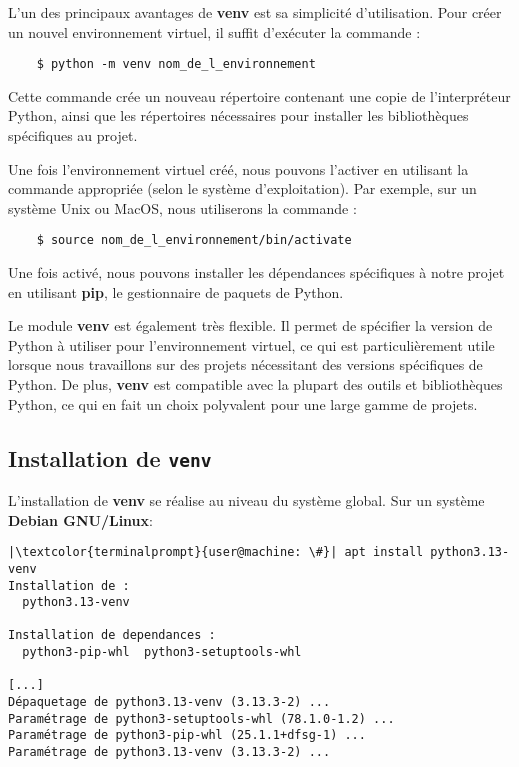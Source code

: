 L'un des principaux avantages de \textbf{venv} est sa simplicité d'utilisation. Pour créer un nouvel environnement virtuel, il suffit d'exécuter la commande :
\begin{verbatim}
    $ python -m venv nom_de_l_environnement
\end{verbatim}

Cette commande crée un nouveau répertoire contenant une copie de l'interpréteur Python, ainsi que les répertoires nécessaires pour installer les bibliothèques spécifiques au projet.

Une fois l'environnement virtuel créé, nous pouvons l'activer en utilisant la commande appropriée (selon le système d'exploitation). Par exemple, sur un système Unix ou MacOS, nous utiliserons la commande :
\begin{verbatim}
    $ source nom_de_l_environnement/bin/activate
\end{verbatim}

Une fois activé, nous pouvons installer les dépendances spécifiques à notre projet en utilisant \textbf{pip}, le gestionnaire de paquets de Python.

Le module \textbf{venv} est également très flexible. Il permet de spécifier la version de Python à utiliser pour l'environnement virtuel, ce qui est particulièrement utile lorsque nous travaillons sur des projets nécessitant des versions spécifiques de Python. De plus, \textbf{venv} est compatible avec la plupart des outils et bibliothèques Python, ce qui en fait un choix polyvalent pour une large gamme de projets.

\subsection*{Installation de \texttt{venv}}
L'installation de \textbf{venv} se réalise au niveau du système global. Sur un système \textbf{Debian GNU/Linux}:

\begin{lstlisting}[style=terminal]
|\textcolor{terminalprompt}{user@machine: \#}| apt install python3.13-venv
Installation de :
  python3.13-venv

Installation de dependances :
  python3-pip-whl  python3-setuptools-whl

[...]
Dépaquetage de python3.13-venv (3.13.3-2) ...
Paramétrage de python3-setuptools-whl (78.1.0-1.2) ...
Paramétrage de python3-pip-whl (25.1.1+dfsg-1) ...
Paramétrage de python3.13-venv (3.13.3-2) ...
\end{lstlisting}


